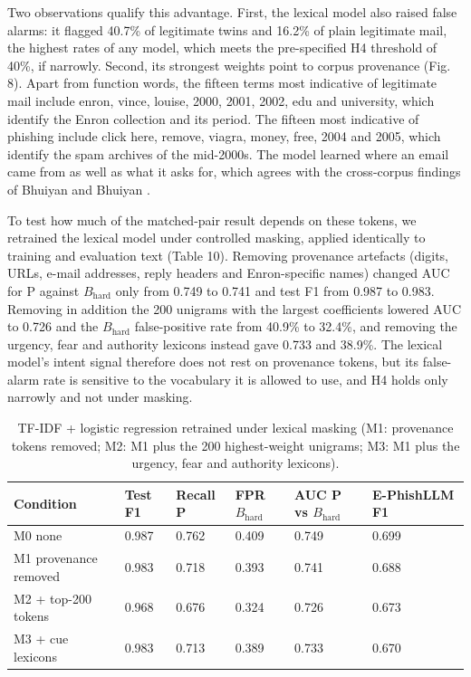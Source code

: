 \documentclass[11pt,letterpaper]{article}
\begin{document}
Two observations qualify this advantage. First, the lexical model also raised false alarms: it flagged 40.7\% of legitimate twins and 16.2\% of plain legitimate mail, the highest rates of any model, which meets the pre-specified H4 threshold of 40\%, if narrowly. Second, its strongest weights point to corpus provenance (Fig. 8). Apart from function words, the fifteen terms most indicative of legitimate mail include enron, vince, louise, 2000, 2001, 2002, edu and university, which identify the Enron collection and its period. The fifteen most indicative of phishing include click here, remove, viagra, money, free, 2004 and 2005, which identify the spam archives of the mid-2000s. The model learned where an email came from as well as what it asks for, which agrees with the cross-corpus findings of Bhuiyan and Bhuiyan \cite{bhuiyan2026}.

To test how much of the matched-pair result depends on these tokens, we retrained the lexical model under controlled masking, applied identically to training and evaluation text (Table 10). Removing provenance artefacts (digits, URLs, e-mail addresses, reply headers and Enron-specific names) changed AUC for P against $B_{\mathrm{hard}}$ only from 0.749 to 0.741 and test F1 from 0.987 to 0.983. Removing in addition the 200 unigrams with the largest coefficients lowered AUC to 0.726 and the $B_{\mathrm{hard}}$ false-positive rate from 40.9\% to 32.4\%, and removing the urgency, fear and authority lexicons instead gave 0.733 and 38.9\%. The lexical model's intent signal therefore does not rest on provenance tokens, but its false-alarm rate is sensitive to the vocabulary it is allowed to use, and H4 holds only narrowly and not under masking.

\begin{table}[!htbp]
\centering
\footnotesize
\caption{TF-IDF + logistic regression retrained under lexical masking (M1: provenance tokens removed; M2: M1 plus the 200 highest-weight unigrams; M3: M1 plus the urgency, fear and authority lexicons).}
\begin{tabularx}{\linewidth}{Ylllll}
\toprule
\textbf{Condition} & \textbf{Test F1} & \textbf{Recall P} & \textbf{FPR $B_{\mathrm{hard}}$} & \textbf{AUC P vs $B_{\mathrm{hard}}$} & \textbf{E-PhishLLM F1} \\
\midrule
M0 none & 0.987 & 0.762 & 0.409 & 0.749 & 0.699 \\
M1 provenance removed & 0.983 & 0.718 & 0.393 & 0.741 & 0.688 \\
M2 + top-200 tokens & 0.968 & 0.676 & 0.324 & 0.726 & 0.673 \\
M3 + cue lexicons & 0.983 & 0.713 & 0.389 & 0.733 & 0.670 \\
\bottomrule
\end{tabularx}
\end{table}
\end{document}
